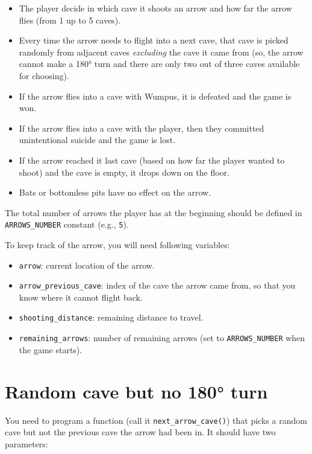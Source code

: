 \documentclass[
]{book}
\providecommand{\tightlist}{%
  \setlength{\itemsep}{0pt}\setlength{\parskip}{0pt}}
\begin{document}
\begin{itemize}
\tightlist
\item
  The player decide in which cave it shoots an arrow and how far the arrow flies (from 1 up to 5 caves).
\item
  Every time the arrow needs to flight into a next cave, that cave is picked randomly from adjacent caves \emph{excluding} the cave it came from (so, the arrow cannot make a 180° turn and there are only two out of three caves available for choosing).
\item
  If the arrow flies into a cave with Wumpus, it is defeated and the game is won.
\item
  If the arrow flies into a cave with the player, then they committed unintentional suicide and the game is lost.
\item
  If the arrow reached it last cave (based on how far the player wanted to shoot) and the cave is empty, it drops down on the floor.
\item
  Bats or bottomless pits have no effect on the arrow.
\end{itemize}

The total number of arrows the player has at the beginning should be defined in \texttt{ARROWS\_NUMBER} constant (e.g., \texttt{5}).

To keep track of the arrow, you will need following variables:

\begin{itemize}
\tightlist
\item
  \texttt{arrow}: current location of the arrow.
\item
  \texttt{arrow\_previous\_cave}: index of the cave the arrow came from, so that you know where it cannot flight back.
\item
  \texttt{shooting\_distance}: remaining distance to travel.
\item
  \texttt{remaining\_arrows}: number of remaining arrows (set to \texttt{ARROWS\_NUMBER} when the game starts).
\end{itemize}

\hypertarget{random-cave-but-no-180-turn}{%
\section{Random cave but no 180° turn}\label{random-cave-but-no-180-turn}}

You need to program a function (call it \texttt{next\_arrow\_cave()}) that picks a random cave but not the previous cave the arrow had been in. It should have two parameters:
\end{document}
